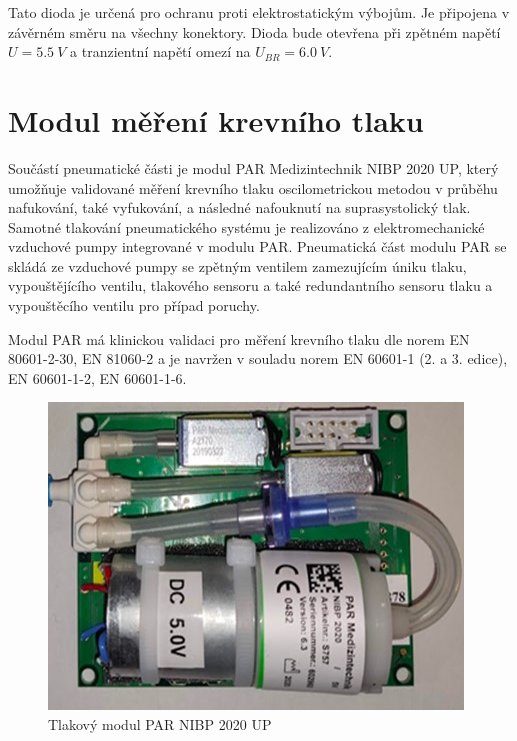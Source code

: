 Tato dioda je určená pro ochranu proti elektrostatickým výbojům. Je připojena v závěrném směru na všechny konektory. Dioda bude otevřena při zpětném napětí
$U = 5.5 \ V $ a tranzientní napětí omezí na $U_{BR} = 6.0 \ V $.

\section{Modul měření krevního tlaku}

Součástí pneumatické části je modul PAR Medizintechnik NIBP 2020 UP, který umožňuje validované měření krevního tlaku oscilometrickou metodou v průběhu nafukování, také vyfukování, a následné nafouknutí na suprasystolický tlak. Samotné tlakování pneumatického systému je realizováno z elektromechanické vzduchové pumpy integrované v modulu PAR.
Pneumatická část modulu PAR se skládá ze vzduchové pumpy se zpětným ventilem zamezujícím úniku tlaku, vypouštějícího ventilu, tlakového sensoru a také redundantního sensoru tlaku a vypouštěcího ventilu pro případ poruchy. \par
Modul PAR má klinickou validaci pro měření krevního tlaku dle norem EN 80601-2-30, EN 81060-2 a je navržen v souladu norem EN 60601-1 (2. a 3. edice), EN 60601-1-2, EN 60601-1-6.
\begin{figure}[H]
    \centering
    \includegraphics{pictures/par_nibp_up.jpg}
    \caption{Tlakový modul PAR NIBP 2020 UP}
    \label{fig:par_modul}
\end{figure}

